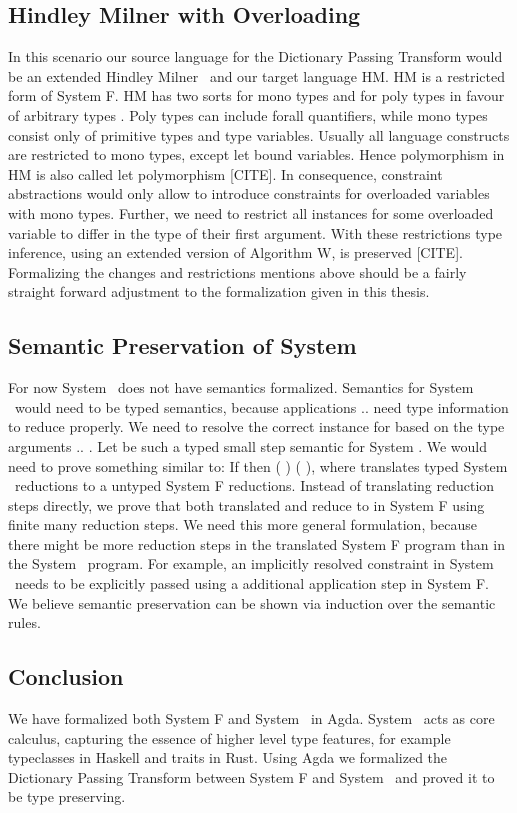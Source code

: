 \subsection{Hindley Milner with Overloading}
In this scenario our source language for the Dictionary Passing Transform would be an extended Hindley Milner \HMo\ and our target language HM. 
HM is a restricted form of System F. HM has two sorts  for mono types and  for poly types in favour of arbitrary types . Poly types can include forall quantifiers, while mono types consist only of primitive types and type variables. 
Usually all language constructs are restricted to mono types, except let bound variables. 
Hence polymorphism in HM is also called let polymorphism [CITE].  
In consequence, constraint abstractions would only allow to introduce constraints for overloaded variables with mono types. 
Further, we need to restrict all instances for some overloaded variable  to differ in the type of their first argument.
With these restrictions type inference, using an extended version of Algorithm W, is preserved [CITE]. Formalizing the changes and restrictions mentions above should be a fairly straight forward adjustment to the formalization given in this thesis.

\subsection{Semantic Preservation of System \Fo}
For now System \Fo\ does not have semantics formalized.
Semantics for System \Fo\ would need to be typed semantics, because applications     $..$   need type information to reduce properly.
We need to resolve the correct instance for  based on the type arguments  $..$ . 
Let    be such a typed small step semantic for System \Fo. We would need to prove something similar to: If    then  \Constr{[}  \Constr{]} (   )  (   ), where  translates typed System \Fo\ reductions to a untyped System F reductions.
Instead of translating reduction steps directly, we prove that both translated  and  reduce to  in System F using finite many reduction steps.
We need this more general formulation, because there might be more reduction steps in the translated System F program than in the System \Fo\ program. 
For example, an implicitly resolved constraint in System \Fo\ needs to be explicitly passed using a additional application step in System F. 
We believe semantic preservation can be shown via induction over the semantic rules.
\subsection{Conclusion}
We have formalized both System F and System \Fo\ in Agda. 
System \Fo\ acts as core calculus, capturing the essence of higher level type features, for example typeclasses in Haskell and traits in Rust. 
Using Agda we formalized the Dictionary Passing Transform between System F and System \Fo\ and proved it to be type preserving.